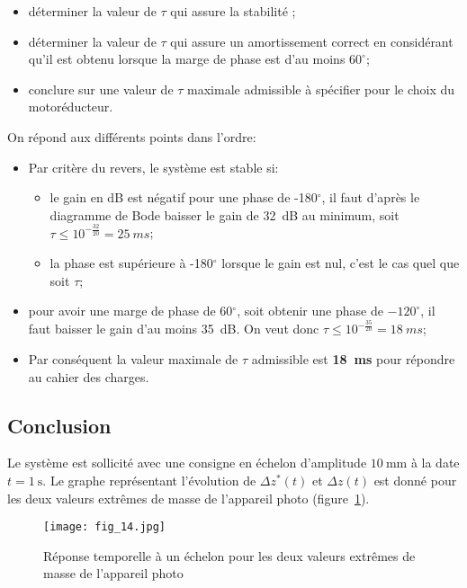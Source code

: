 \begin{itemize}
  \item déterminer la valeur de $\tau$ qui assure la stabilité ;
  \item déterminer la valeur de $\tau$ qui assure un amortissement correct en considérant qu'il est obtenu lorsque la marge de phase est d'au moins $60^{\circ}$;
\item conclure sur une valeur de $\tau$ maximale admissible à spécifier pour le choix du motoréducteur.
\end{itemize}
\ifprof
\begin{corrige}
On répond aux différents points dans l'ordre:
\begin{itemize}
\item Par critère du revers, le système est stable si: 
\begin{itemize}
\item le gain en dB est négatif pour une phase de -180$^{\circ}$, il faut d'après le diagramme de Bode baisser le gain de \SI{32}{dB} au minimum, soit $\tau \leq 10^{-\frac{32}{20}} = \SI{25}{ms}$;
\item la phase est supérieure à -180$^{\circ}$ lorsque le gain est nul, c'est le cas quel que soit $\tau$;
\end{itemize}
\item pour avoir une marge de phase de 60$^{\circ}$, soit obtenir une phase de $-120^{\circ}$, il faut baisser le gain d'au moins \SI{35}{dB}. On veut donc $\tau \leq 10^{-\frac{35}{20}} = \SI{18}{ms}$;
\item Par conséquent la valeur maximale de $\tau$ admissible est \textbf{\SI{18}{ms}} pour répondre au cahier des charges.
\end{itemize}

\end{corrige}
\else
\fi


\subsection{Conclusion}
\ifprof
\else
Le système est sollicité avec une consigne en échelon d'amplitude $10 \mathrm{~mm}$ à la date $t=1 \mathrm{~s}$. Le graphe représentant l'évolution de $\Delta z^{*}(t)$ et $\Delta z(t)$ est donné pour les deux valeurs extrêmes de masse de l'appareil photo (figure~\ref{fig:14}).

\begin{figure}[H]
\centering
\texttt{[image: fig\_14.jpg]}
\caption{\label{fig:14}  Réponse temporelle à un échelon pour les deux valeurs extrêmes de masse de l'appareil photo}
\end{figure}
\fi

